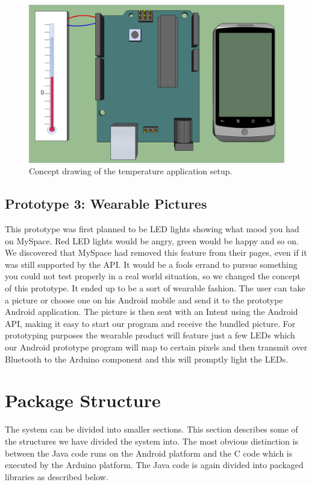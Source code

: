 \begin{figure}
	\begin{center}
	\includegraphics[scale=0.4]{img/design-temperature}
	\end{center}
	\caption{Concept drawing of the temperature application setup.}
	\label{fig:design-temperature}
\end{figure}

\subsection{Prototype 3: Wearable Pictures}
This prototype was first planned to be LED lights showing what mood you had on MySpace. Red LED lights would be angry,
green would be happy and so on. We discovered that MySpace had removed this feature from their pages, even if it was
still supported by the API. It would be a fools errand to pursue something you could not test properly
in a real world situation, so we changed the concept of this prototype. It ended up to be a sort of wearable fashion.
The user can take a picture or choose one on his Android mobile and send it to the prototype Android application.
The picture is then sent with an Intent using the Android API, making it easy to start our program and receive
the bundled picture. For prototyping purposes the wearable product will feature just a few LEDs which our Android
prototype program will map to certain pixels and then transmit over Bluetooth to the Arduino
component and this will promptly light the LEDs.

\section{Package Structure}
The system can be divided into smaller sections. This section describes some of the structures
we have divided the system into. The most obvious distinction is between the Java code runs
on the Android platform and the C code which is executed by the Arduino platform.
The Java code is again divided into packaged libraries as described below.

